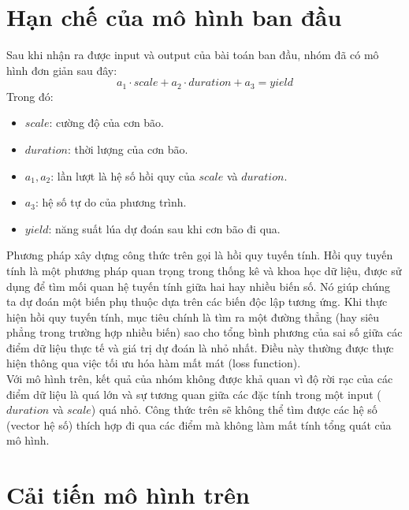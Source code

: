 \documentclass[12pt]{report}
\begin{document}
\section{Hạn chế của mô hình ban đầu} %
\label{sec:hạn_chế_của_mô_hình_ban_đầu}
\begin{flushleft}
	Sau khi nhận ra được input và output của bài toán ban đầu, nhóm đã có mô hình đơn giản sau đây:
	$$
		a_{1} \cdot {scale} + a_{2} \cdot {duration} + a_{3} = yield
	$$
	Trong đó:
	\begin{itemize}
		\item $scale$: cường độ của cơn bão.

		\item $duration$: thời lượng của cơn bão.

		\item $a_{1}, a_{2}$: lần lượt là hệ số hồi quy của $scale$ và $duration$.

		\item $a_{3}$: hệ số tự do của phương trình.

		\item $yield$: năng suất lúa dự đoán sau khi cơn bão đi qua.
	\end{itemize}

	Phương pháp xây dựng công thức trên gọi là hồi quy tuyến tính. Hồi quy tuyến tính là một phương pháp quan trọng trong thống kê và khoa học dữ liệu, được sử dụng để tìm mối quan hệ tuyến tính giữa hai hay nhiều biến số. Nó giúp chúng ta dự đoán một biến phụ thuộc dựa trên các biến độc lập tương ứng. Khi thực hiện hồi quy tuyến tính, mục tiêu chính là tìm ra một đường thẳng (hay siêu phẳng trong trường hợp nhiều biến) sao cho tổng bình phương của sai số giữa các điểm dữ liệu thực tế và giá trị dự đoán là nhỏ nhất. Điều này thường được thực hiện thông qua việc tối ưu hóa hàm mất mát (loss function).
	\\[\baselineskip]

	Với mô hình trên, kết quả của nhóm không được khả quan vì độ rời rạc của các điểm dữ liệu là quá lớn và sự tương quan giữa các đặc tính trong một input ($duration$ và $scale$) quá nhỏ. Công thức trên sẽ không thể tìm được các hệ số (vector hệ số) thích hợp đi qua các điểm mà không làm mất tính tổng quát của mô hình.
\end{flushleft}

\section{Cải tiến mô hình trên} %
\label{sec:cải_tiến_mô_hình_trên}
\end{document}
